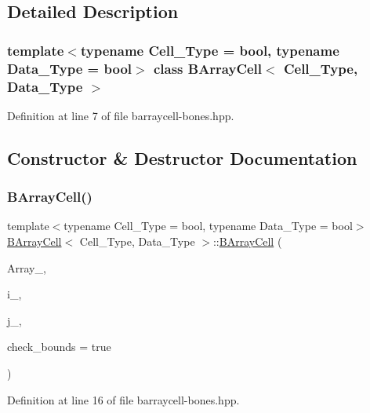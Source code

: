 \subsection{Detailed Description}
\subsubsection*{template$<$typename Cell\+\_\+\+Type = bool, typename Data\+\_\+\+Type = bool$>$\newline
class B\+Array\+Cell$<$ Cell\+\_\+\+Type, Data\+\_\+\+Type $>$}



Definition at line 7 of file barraycell-\/bones.\+hpp.



\subsection{Constructor \& Destructor Documentation}
\mbox{\label{class_b_array_cell_a1e93556da4b5f6a372e6c65ac1044830}} 
\subsubsection{\texorpdfstring{B\+Array\+Cell()}{BArrayCell()}}
{\footnotesize\ttfamily template$<$typename Cell\+\_\+\+Type = bool, typename Data\+\_\+\+Type = bool$>$ \\
\hyperlink{class_b_array_cell}{B\+Array\+Cell}$<$ Cell\+\_\+\+Type, Data\+\_\+\+Type $>$\+::\hyperlink{class_b_array_cell}{B\+Array\+Cell} (\begin{DoxyParamCaption}\item[{\hyperlink{class_b_array}{B\+Array}$<$ Cell\+\_\+\+Type, Data\+\_\+\+Type $>$ $\ast$}]{Array\+\_\+,  }\item[{\hyperlink{typedefs_8hpp_a91ad9478d81a7aaf2593e8d9c3d06a14}{uint}}]{i\+\_\+,  }\item[{\hyperlink{typedefs_8hpp_a91ad9478d81a7aaf2593e8d9c3d06a14}{uint}}]{j\+\_\+,  }\item[{bool}]{check\+\_\+bounds = {\ttfamily true} }\end{DoxyParamCaption})\hspace{0.3cm}{\ttfamily [inline]}}



Definition at line 16 of file barraycell-\/bones.\+hpp.

